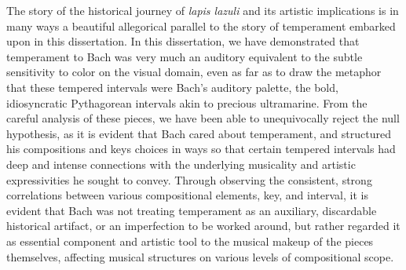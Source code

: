 The story of the historical journey of \emph{lapis lazuli} and its
artistic implications is in many ways a beautiful allegorical parallel
to the story of temperament embarked upon in this dissertation. In this
dissertation, we have demonstrated that temperament to Bach was very
much an auditory equivalent to the subtle sensitivity to color on the
visual domain, even as far as to draw the metaphor that these tempered
intervals were Bach's auditory palette, the bold, idiosyncratic
Pythagorean intervals akin to precious ultramarine. From the careful
analysis of these pieces, we have been able to unequivocally reject the
null hypothesis, as it is evident that Bach cared about temperament, and
structured his compositions and keys choices in ways so that certain
tempered intervals had deep and intense connections with the underlying
musicality and artistic expressivities he sought to convey. Through
observing the consistent, strong correlations between various
compositional elements, key, and interval, it is evident that Bach was
not treating temperament as an auxiliary, discardable historical
artifact, or an imperfection to be worked around, but rather regarded it
as essential component and artistic tool to the musical makeup of the
pieces themselves, affecting musical structures on various levels of
compositional scope.

